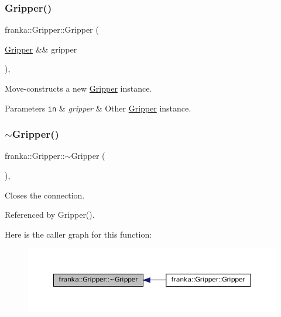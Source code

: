 \subsubsection{\texorpdfstring{Gripper()}{Gripper()}\hspace{0.1cm}{\footnotesize\ttfamily [2/2]}}
{\footnotesize\ttfamily franka\+::\+Gripper\+::\+Gripper (\begin{DoxyParamCaption}\item[{\hyperlink{classfranka_1_1Gripper}{Gripper} \&\&}]{gripper }\end{DoxyParamCaption})\hspace{0.3cm}{\ttfamily [default]}, {\ttfamily [noexcept]}}

Move-\/constructs a new \hyperlink{classfranka_1_1Gripper}{Gripper} instance.


\begin{DoxyParams}[1]{Parameters}
\mbox{\tt in}  & {\em gripper} & Other \hyperlink{classfranka_1_1Gripper}{Gripper} instance. \\
\hline
\end{DoxyParams}
\mbox{\label{classfranka_1_1Gripper_ade253b8a35312d52c636c6aafb7b2e1d}} 
\subsubsection{\texorpdfstring{$\sim$\+Gripper()}{~Gripper()}}
{\footnotesize\ttfamily franka\+::\+Gripper\+::$\sim$\+Gripper (\begin{DoxyParamCaption}{ }\end{DoxyParamCaption})\hspace{0.3cm}{\ttfamily [default]}, {\ttfamily [noexcept]}}

Closes the connection. 

Referenced by Gripper().

Here is the caller graph for this function\+:
\nopagebreak
\begin{figure}[H]
\begin{center}
\leavevmode
\includegraphics[width=350pt]{classfranka_1_1Gripper_ade253b8a35312d52c636c6aafb7b2e1d_icgraph}
\end{center}
\end{figure}


